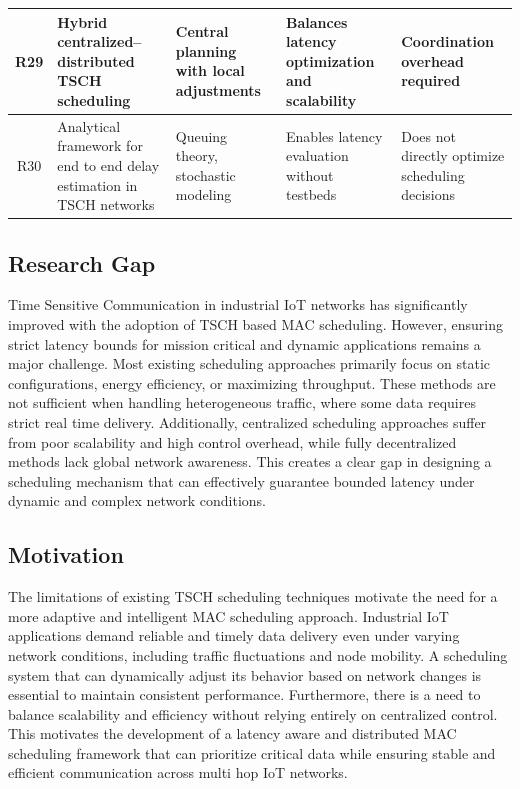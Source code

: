 \documentclass[a4paper,fleqn]{cas-dc}
\numberwithin{equation}{section}
\begin{document}
\begin{table}[htbp]
\begin{tabular}{|c|p{3.2cm}|p{3.2cm}|p{3.4cm}|p{3.2cm}|}
\hline
R29 & Hybrid centralized–distributed TSCH scheduling\cite{jeong2019tesla} & Central planning with local adjustments & Balances latency optimization and scalability & Coordination overhead required \\
\hline
R30 & Analytical framework for end to end delay estimation in TSCH networks\cite{kim2019alice} & Queuing theory, stochastic modeling & Enables latency evaluation without testbeds & Does not directly optimize scheduling decisions \\
\hline
\end{tabular}
\end{table}

\subsection{Research Gap}
Time Sensitive Communication in industrial IoT networks has significantly improved with the adoption of TSCH based MAC scheduling. However, ensuring strict latency bounds for mission critical and dynamic applications remains a major challenge. Most existing scheduling approaches primarily focus on static configurations, energy efficiency, or maximizing throughput. These methods are not sufficient when handling heterogeneous traffic, where some data requires strict real time delivery. Additionally, centralized scheduling approaches suffer from poor scalability and high control overhead, while fully decentralized methods lack global network awareness. This creates a clear gap in designing a scheduling mechanism that can effectively guarantee bounded latency under dynamic and complex network conditions.

\subsection{Motivation}
The limitations of existing TSCH scheduling techniques motivate the need for a more adaptive and intelligent MAC scheduling approach. Industrial IoT applications demand reliable and timely data delivery even under varying network conditions, including traffic fluctuations and node mobility. A scheduling system that can dynamically adjust its behavior based on network changes is essential to maintain consistent performance. Furthermore, there is a need to balance scalability and efficiency without relying entirely on centralized control. This motivates the development of a latency aware and distributed MAC scheduling framework that can prioritize critical data while ensuring stable and efficient communication across multi hop IoT networks.
 
\end{document}
